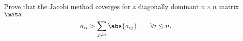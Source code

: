 \begin{Problem}
  Prove that the Jacobi method coverges for a diagonally dominant
  $n\times n$ matrix $\mata$
  \begin{gather*}
    a_{ii} > \sum_{j\neq i} \abs{a_{ij}} \qquad\forall i\leq n.
  \end{gather*}
\end{Problem}
